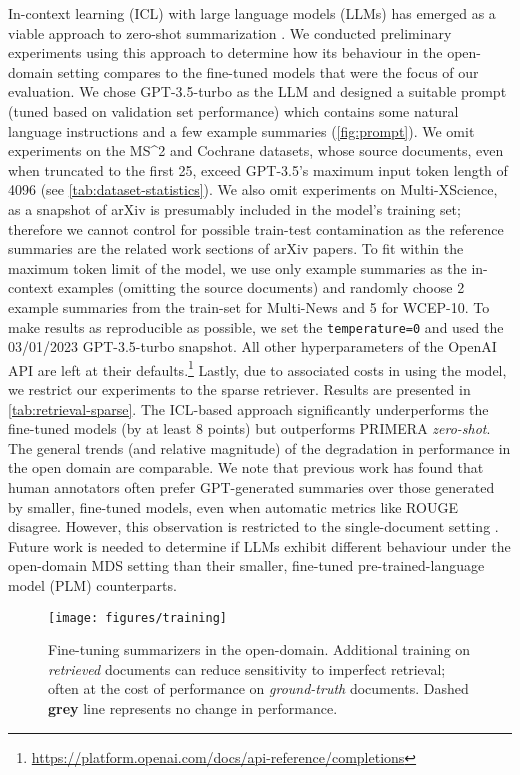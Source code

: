 \documentclass[11pt]{article}
\newcommand\mstoo{{MS\^{}2}\xspace}
\begin{document}
In-context learning (ICL) with large language models (LLMs) has emerged as a viable approach to zero-shot summarization \cite{Goyal2022NewsSA}. We conducted preliminary experiments using this approach to determine how its behaviour in the open-domain setting compares to the fine-tuned models that were the focus of our evaluation. We chose GPT-3.5-turbo as the LLM and designed a suitable prompt (tuned based on validation set performance) which contains some natural language instructions and a few example summaries (\autoref{fig:prompt}). We omit experiments on the \mstoo and Cochrane datasets, whose source documents, even when truncated to the first 25, exceed GPT-3.5's maximum input token length of 4096 (see \autoref{tab:dataset-statistics}). We also omit experiments on Multi-XScience, as a snapshot of arXiv is presumably included in the model's training set; therefore we cannot control for possible train-test contamination as the reference summaries are the related work sections of arXiv papers. To fit within the maximum token limit of the model, we use only example summaries as the in-context examples (omitting the source documents) and randomly choose 2 example summaries from the train-set for Multi-News and 5 for WCEP-10. To make results as reproducible as possible, we set the \texttt{temperature=0} and used the 03/01/2023 GPT-3.5-turbo snapshot. All other hyperparameters of the OpenAI API are left at their defaults.\footnote{\url{https://platform.openai.com/docs/api-reference/completions}} Lastly, due to associated costs in using the model, we restrict our experiments to the sparse retriever.  Results are presented in \autoref{tab:retrieval-sparse}. The ICL-based approach significantly underperforms the fine-tuned models (by at least 8 points) but outperforms PRIMERA \textit{zero-shot}. The general trends (and relative magnitude) of the degradation in performance in the open domain are comparable. We note that previous work has found that human annotators often prefer GPT-generated summaries over those generated by smaller, fine-tuned models, even when automatic metrics like ROUGE disagree. However, this observation is restricted to the single-document setting \cite{Goyal2022NewsSA}. Future work is needed to determine if LLMs exhibit different behaviour under the open-domain MDS setting than their smaller, fine-tuned pre-trained-language model (PLM) counterparts.

\begin{figure}[t]
\texttt{[image: figures/training]}
\caption{Fine-tuning summarizers in the open-domain. Additional training on \textit{retrieved} documents can reduce sensitivity to imperfect retrieval; often at the cost of performance on \textit{ground-truth} documents. Dashed \textcolor{MyGrey}{\textbf{grey}} line represents no change in performance.
}
\label{fig:training}
\vspace{-3.5mm}
\end{figure}
\end{document}
